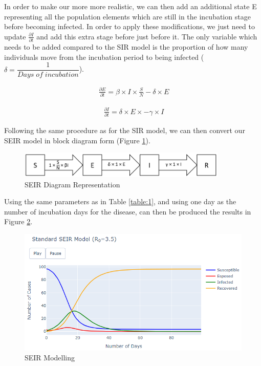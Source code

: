 In order to make our more more realistic, we can then add an additional state E representing all the population elements which are still in the incubation stage before becoming infected. In order to apply these modifications, we just need to update $\frac{\partial I}{\partial t}$ and add this extra stage before just before it. The only variable which needs to be added compared to the SIR model is the proportion of how many individuals move from the incubation period to being infected ($\delta = \dfrac{1}{Days\;of\;incubation}$).

\useshortskip
\begin{align}
\ \frac{\partial E}{\partial t} = \beta \times I \times \frac{S}{N} -\delta \times E
\end{align}
\useshortskip

\useshortskip
\begin{align}
\ \frac{\partial I}{\partial t} = \delta \times E \times -\gamma \times I
\end{align}
\useshortskip

Following the same procedure as for the SIR model, we can then convert our SEIR model in block diagram form (Figure \ref{dseir}).

\begin{figure}[ht!]%
    \centering
    \includegraphics[width=10cm]{latex/images/dseir.PNG}%
    \caption{SEIR Diagram Representation}
    \label{dseir}
\end{figure}

Using the same parameters as in Table \ref{table:1}, and using one day as the number of incubation days for the disease, can then be produced the results in Figure \ref{seir}.

\begin{figure}[ht!]%
    \centering
    \includegraphics[width=13cm]{latex/images/seir.PNG}%
    \caption{SEIR Modelling}
    \label{seir}
\end{figure}

